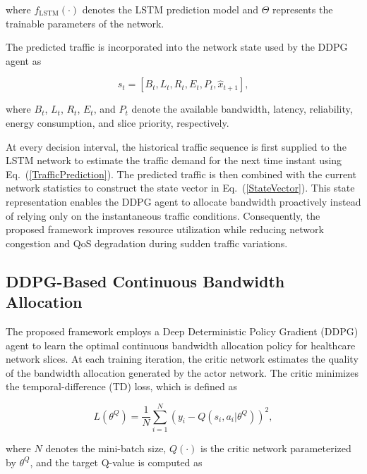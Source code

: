 \documentclass[10pt,journal,compsoc]{IEEEtran}
\begin{document}
where $f_{\mathrm{LSTM}}(\cdot)$ denotes the LSTM prediction model and $\Theta$ represents the trainable parameters of the network.

The predicted traffic is incorporated into the network state used by the DDPG agent as \cite{kumar2025lstmddpg}

\begin{equation}
s_t=
\left[
B_t,
L_t,
R_t,
E_t,
P_t,
\hat{x}_{t+1}
\right],
\label{StateVector}
\end{equation}

where $B_t$, $L_t$, $R_t$, $E_t$, and $P_t$ denote the available bandwidth, latency, reliability, energy consumption, and slice priority, respectively.

At every decision interval, the historical traffic sequence is first supplied to the LSTM network to estimate the traffic demand for the next time instant using Eq.~(\ref{TrafficPrediction}). The predicted traffic is then combined with the current network statistics to construct the state vector in Eq.~(\ref{StateVector}). This state representation enables the DDPG agent to allocate bandwidth proactively instead of relying only on the instantaneous traffic conditions. Consequently, the proposed framework improves resource utilization while reducing network congestion and QoS degradation during sudden traffic variations.







\subsection{DDPG-Based Continuous Bandwidth Allocation}
\label{DDPG}

The proposed framework employs a Deep Deterministic Policy Gradient (DDPG) agent to learn the optimal continuous bandwidth allocation policy for healthcare network slices. At each training iteration, the critic network estimates the quality of the bandwidth allocation generated by the actor network. The critic minimizes the temporal-difference (TD) loss, which is defined as \cite{tariq2025ddpgv2x,yang2025ddpg}

\begin{equation}
\label{CriticLoss}
L(\theta^{Q})
=
\frac{1}{N}
\sum_{i=1}^{N}
\left(
y_i-
Q(s_i,a_i|\theta^{Q})
\right)^2,
\end{equation}

where $N$ denotes the mini-batch size, $Q(\cdot)$ is the critic network parameterized by $\theta^{Q}$, and the target Q-value is computed as \cite{tariq2025ddpgv2x}
\end{document}
